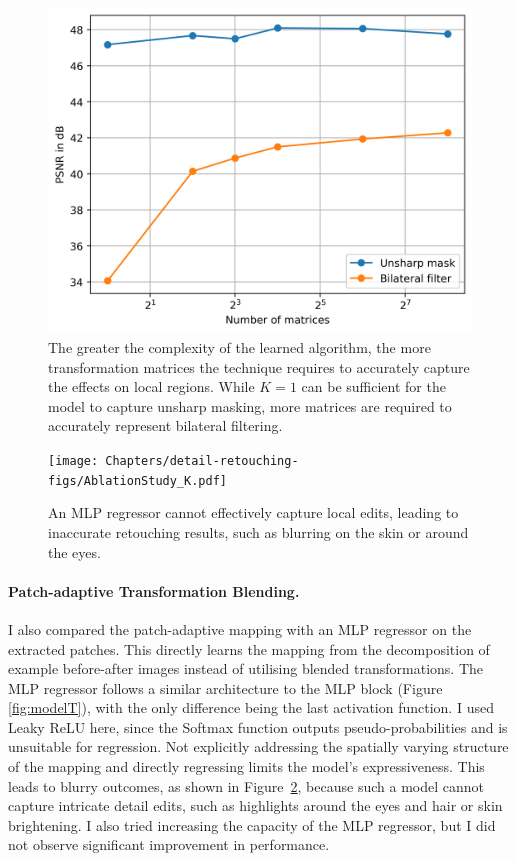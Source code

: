 \begin{figure}[th] %
    \centering
	\includegraphics[width=0.6\columnwidth]{Chapters/detail-retouching-figs/ablation_matrices.png}

    \caption{The greater the complexity of the learned algorithm, the more transformation matrices the technique requires to accurately capture the effects on local regions. While $K=1$ can be sufficient for the model to capture unsharp masking, more matrices are required to accurately represent bilateral filtering.}

    \label{fig:ablation_K}
\end{figure}

\begin{figure}%
\centering
\texttt{[image: Chapters/detail-retouching-figs/AblationStudy\_K.pdf]}
    \caption{An MLP regressor cannot effectively capture local edits, leading to inaccurate retouching results, such as blurring on the skin or around the eyes.}

\label{fig:ablation_MLP}
\end{figure}
\paragraph{Patch-adaptive Transformation Blending.} I also compared the patch-adaptive mapping with an MLP regressor on the extracted patches. This directly learns the mapping from the decomposition of example before-after images instead of utilising blended transformations. The MLP regressor follows a similar architecture to the MLP block (Figure \ref{fig:modelT}), with the only difference being the last activation function. I used Leaky ReLU here, since the Softmax function outputs pseudo-probabilities and is unsuitable for regression. Not explicitly addressing the spatially varying structure of the mapping and directly regressing limits the model’s expressiveness. This leads to blurry outcomes, as shown in Figure~\ref{fig:ablation_MLP}, because such a model cannot capture intricate detail edits, such as highlights around the eyes and hair or skin brightening. I also tried increasing the capacity of the MLP regressor, but I did not observe significant improvement in performance.



